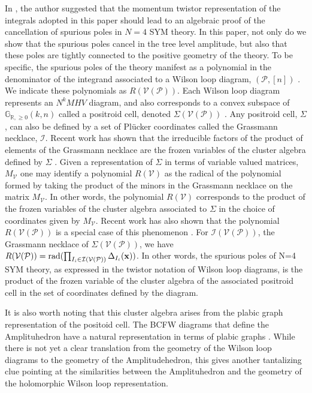 \documentclass[11pt]{article}
\newcommand{\R}{\mathbb{R}}
\newcommand{\Gr}{\mathbb{G}_{\R, \geq 0}}
\newcommand{\cP}{\mathcal{P}}
\newcommand{\cV}{\mathcal{V}}
\newcommand{\VP}{\cV(\cP)}
\newcommand{\cI}{\mathcal{I}}
\theoremstyle{remark}
\theoremstyle{definition}
\begin{document}
In \cite{hodges:2013eliminating}, the author suggested that the momentum twistor representation of the integrals adopted in this paper should lead to an algebraic proof of the cancellation of spurious poles in  $N=4$ SYM theory. In this paper, not only do we show that the spurious poles cancel in the tree level amplitude,  but also that these poles are tightly connected to the positive geometry of the theory. To be specific, the spurious poles of the theory manifest as a polynomial in the denominator of the integrand associated to a Wilson loop diagram, $(\cP, [n])$ \cite{Adamo:2012xe, HeslopStewart, hodges:2013eliminating}. We indicate these polynomials as $R(\VP)$. Each Wilson loop diagram represents an $N^kMHV$ diagram, and also corresponds to a convex subspace of $\Gr(k,n)$ called a positroid cell, denoted $\Sigma(\VP)$ \cite{Wilsonloop, generalcombinatoricsI}. Any positroid cell, $\Sigma$, can also be defined by a set of Pl\"{u}cker coordinates called the Grassmann necklace, $\cI$\cite[Section 16]{Postnikov}. Recent work has shown that the irreducible factors of the product of elements of the Grassmann necklace are the frozen variables of the cluster algebra defined by $\Sigma$ \cite{galashinlam19, SS-BW}. Given a representation of $\Sigma$ in terms of variable valued matrices, $M_\cV$ one may identify a polynomial $R(\cV)$ as the radical of the polynomial formed by taking the product of the minors in the Grassmann necklace on the matrix $M_\cV$. In other words, the polynomial $R(\cV)$ corresponds to the product of the frozen variables of the cluster algebra associated to $\Sigma$ in the choice of coordinates given by $M_\cV$. Recent work has also shown that the polynomial $R(\VP)$ is a special case of this phenomenon \cite{generalcombinatoricsI}. For $\cI(\VP)$, the Grassmann necklace of $\Sigma(\VP)$, we have $R(\VP) = \textrm{rad}(\prod_{I_i \in \cI(\VP)} \Delta_{I_i}(\bf{x}))$. In other words, the spurious poles of N=4 SYM theory, as expressed in the twistor notation of Wilson loop diagrams, is the product of the frozen variable of the cluster algebra of the associated positroid cell in the set of coordinates defined by the diagram.

It is also worth noting that this cluster algebra arises from the plabic graph representation of the positoid cell. The BCFW diagrams that define the Amplituhedron have a natural representation in terms of plabic graphs \cite[Section 5]{AmplituhedronDecomposition}. While there is not yet a clear translation from the geometry of the Wilson loop diagrams to the geometry of the Amplitudehedron, this gives another tantalizing clue pointing at the similarities between the Amplituhedron and the geometry of the holomorphic Wilson loop representation. 
\end{document}
